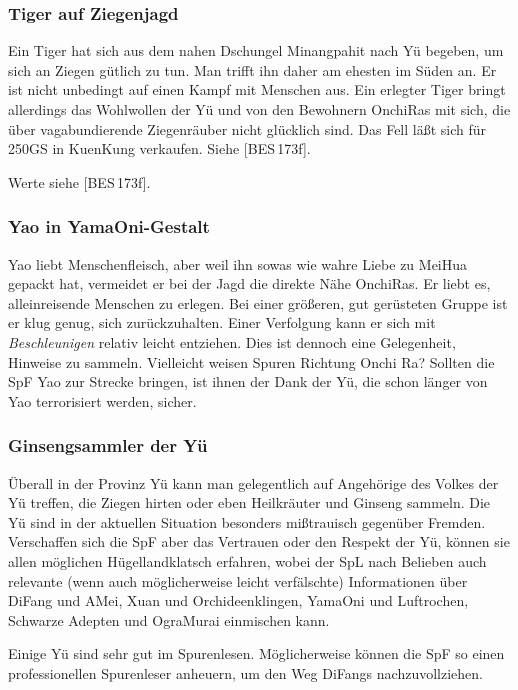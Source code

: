 \documentclass[
a4paper,
twoside,
DIV=calc,
BCOR=4mm,
fontsize=9pt,
twocolumn=on,
titlepage=on,
parskip=half
]{scrartcl}
\begin{document}
\subsubsection{Tiger auf Ziegenjagd}

Ein Tiger hat sich aus dem nahen Dschungel Minangpahit nach Yü
begeben, um sich an Ziegen gütlich zu tun. Man trifft ihn daher am
ehesten im Süden an. Er ist nicht unbedingt auf einen Kampf mit
Menschen aus. Ein erlegter Tiger bringt allerdings das Wohlwollen der
Yü und von den Bewohnern OnchiRas mit sich, die über vagabundierende
Ziegenräuber nicht glücklich sind. Das Fell läßt sich für 250GS in
KuenKung verkaufen. Siehe [BES\,173f].

Werte siehe [BES\,173f].

\subsubsection{Yao in YamaOni-Gestalt}

Yao liebt Menschenfleisch, aber weil ihn sowas wie wahre Liebe zu
MeiHua gepackt hat, vermeidet er bei der Jagd die direkte Nähe
OnchiRas. Er liebt es, alleinreisende Menschen zu erlegen. Bei einer
größeren, gut gerüsteten Gruppe ist er klug genug, sich
zurückzuhalten. Einer Verfolgung kann er sich mit \emph{Beschleunigen}
relativ leicht entziehen. Dies ist dennoch eine Gelegenheit, Hinweise
zu sammeln. Vielleicht weisen Spuren Richtung Onchi Ra? Sollten die
SpF Yao zur Strecke bringen, ist ihnen der Dank der Yü, die schon
länger von Yao terrorisiert werden, sicher.

\subsubsection{Ginsengsammler der Yü}

Überall in der Provinz Yü kann man gelegentlich auf Angehörige des
Volkes der Yü treffen, die Ziegen hirten oder eben Heilkräuter und
Ginseng sammeln. Die Yü sind in der aktuellen Situation besonders
mißtrauisch gegenüber Fremden. Verschaffen sich die SpF aber das
Vertrauen oder den Respekt der Yü, können sie allen möglichen
Hügellandklatsch erfahren, wobei der SpL nach Belieben auch relevante
(wenn auch möglicherweise leicht verfälschte) Informationen über
DiFang und AMei, Xuan und Orchideenklingen, YamaOni und Luftrochen,
Schwarze Adepten und OgraMurai einmischen kann.

Einige Yü sind sehr gut im Spurenlesen. Möglicherweise können die SpF
so einen professionellen Spurenleser anheuern, um den Weg DiFangs
nachzuvollziehen.
\end{document}
